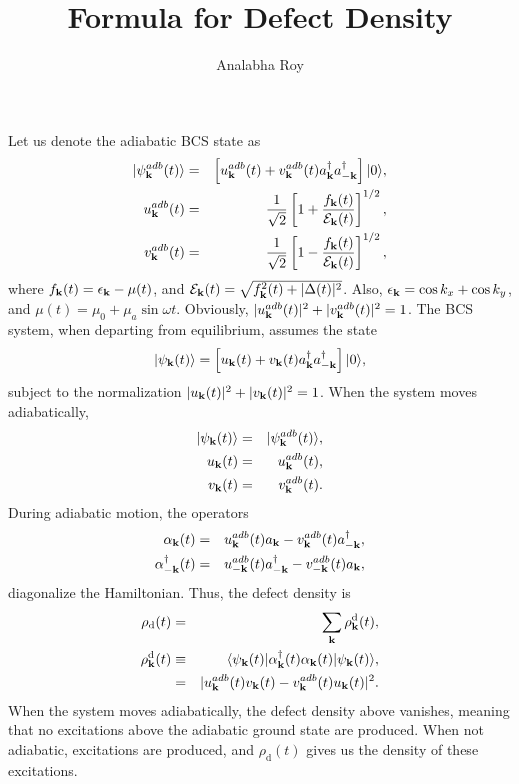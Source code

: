 \documentclass[a4paper,10pt]{article}
\title{Formula for Defect Density}
\author{Analabha Roy}
\begin{document}
\maketitle

Let us denote the adiabatic BCS state as
\begin{eqnarray}
|\psi^{adb}_{\bf k}(t)\rangle &=& \left[u^{adb}_{\bf k}(t) + v^{adb}_{\bf k}(t)a^\dagger_{\bf k} a^{\dagger}_{-{\bf k}} \right]|0\rangle, \nonumber \\
u^{adb}_{\bf k} (t) &=& \frac{1}{\sqrt{2}}\left[1 + \frac{f_{\bf k}(t)}{\mathcal{E}_{\bf k}(t)} \right]^{1/2}, \nonumber \\
v^{adb}_{\bf k} (t) &=& \frac{1}{\sqrt{2}}\left[1 - \frac{f_{\bf k}(t)}{\mathcal{E}_{\bf k}(t)} \right]^{1/2}, 
\end{eqnarray}
where $f_{\bf k}(t) = \epsilon_{\bf k}-\mu(t)$, and $\mathcal{E}_{\bf k}(t) = \sqrt{f^2_{\bf k}(t) + |\Delta(t)|^2}$. Also, $\epsilon_{\bf k} = \cos{k_x}+\cos{k_y}$, and $\mu(t) = \mu_0 + \mu_a\sin{\omega t}$. Obviously,
$|u^{adb}_{\bf k}(t)|^2 + |v^{adb}_{\bf k}(t)|^2 = 1$.  The BCS system, when departing from equilibrium, assumes the state
\begin{equation}
|\psi_{\bf k}(t)\rangle = \left[u_{\bf k}(t) + v_{\bf k}(t)a^\dagger_{\bf k} a^{\dagger}_{-{\bf k}} \right]|0\rangle,
\end{equation}
subject to the normalization $|u_{\bf k}(t)|^2 + |v_{\bf k}(t)|^2 = 1$. When the system moves adiabatically,
\begin{eqnarray}
 |\psi_{\bf k}(t)\rangle &=& |\psi^{adb}_{\bf k}(t)\rangle, \nonumber \\
u_{\bf k}(t)&=&u^{adb}_{\bf k}(t), \nonumber \\
v_{\bf k}(t)&=&v^{adb}_{\bf k}(t). 
\end{eqnarray}
During adiabatic motion, the operators
\begin{eqnarray}
\alpha_{\bf k}(t) &=& u^{adb}_{\bf k}(t) a_{\bf k} - v^{adb}_{\bf k}(t)a^\dagger_{-{\bf k}}, \nonumber \\
\alpha^\dagger_{-{\bf k}}(t) &=& u^{adb}_{-{\bf k}}(t) a^\dagger_{-{\bf k}} - v^{adb}_{-{\bf k}}(t)a_{\bf k},
\end{eqnarray}
diagonalize the Hamiltonian. Thus, the defect density is
\begin{eqnarray}
\rho_{\mathrm d}(t) &=& \sum_{\bf k} \rho^{\mathrm d}_{\bf k}(t),\nonumber \\ 
\rho^{\mathrm d}_{\bf k}(t) &\equiv& \langle \psi_{\bf k}(t)|\alpha^\dagger_{\bf k}(t)\alpha_{\bf k}(t)|\psi_{\bf k}(t)\rangle,\nonumber \\
 &=& |u^{adb}_{\bf k}(t)v_{\bf k}(t)-v^{adb}_{\bf k}(t)u_{\bf k}(t)|^2.
\end{eqnarray}
When the system moves adiabatically, the defect density above vanishes, meaning that no excitations above the adiabatic ground state are produced. When not adiabatic, excitations are produced, and $\rho_{\mathrm d}(t)$ gives us the density of these excitations.
\end{document}
